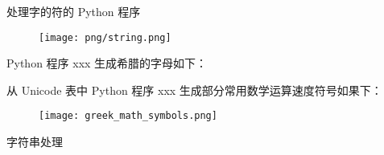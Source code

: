 \documentclass[main.tex]{subfiles}
\begin{document}
处理字的符的 Python 程序

\begin{figure}
	\texttt{[image: png/string.png]}
\end{figure}

Python 程序 xxx 生成希腊的字母如下：


从 Unicode 表中 Python 程序 xxx 生成部分常用数学运算速度符号如果下：


\begin{figure}
	\texttt{[image: greek\_math\_symbols.png]}
\end{figure}



字符串处理

\newpage
\end{document}
